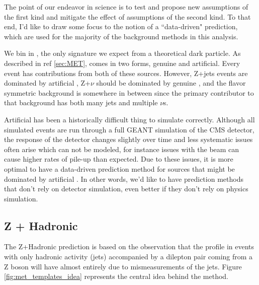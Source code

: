     The point of our endeavor in science is to test and propose new assumptions of the first kind and mitigate the effect of assumptions of the second kind. To that end, I'd like to draw some focus to the notion of a ``data-driven" prediction, which are used for the majority of the background methods in this analysis.

    We bin in \MET, the only signature we expect from a theoretical dark particle. As described in ref \ref{sec:MET}, \MET comes in two forms, genuine and artificial. Every event has contributions from both of these sources. However, Z+jets events are dominated by artificial \MET, Z+$\nu$ should be dominated by genuine \MET, and the flavor symmetric background is somewhere in between since the primary contributor to that background has both many jets and multiple $\nu$s.

    Artificial \MET has been a historically difficult thing to simulate correctly. Although all simulated events are run through a full GEANT simulation of the CMS detector, the response of the detector changes slightly over time and less systematic issues often arise which can not be modeled, for instance issues with the beam can cause higher rates of pile-up than expected.  Due to these issues, it is more optimal to have a data-driven prediction method for sources that might be dominated by artificial \MET. In other words, we'd like to have prediction methods that don't rely on detector simulation, even better if they don't rely on physics simulation. 

  \subsection{Z + Hadronic} \label{sec:z_+_hadronic}
    The Z+Hadronic prediction is based on the observation that the \MET profile in events with only hadronic activity (jets) accompanied by a dilepton pair coming from a Z boson will have \MET almost entirely due to mismeasurements of the jets. Figure \ref{fig:met_templates_idea} represents the central idea behind the method. 

